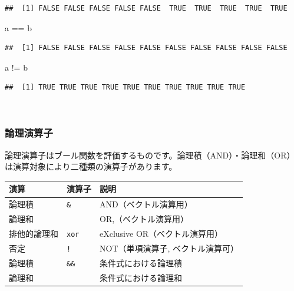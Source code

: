 \documentclass[
  12pt,
]{book}
\newenvironment{Shaded}{\begin{snugshade}}{\end{snugshade}}
\newcommand{\NormalTok}[1]{#1}
\newcommand{\SpecialCharTok}[1]{\textcolor[rgb]{0.00,0.00,0.00}{#1}}
\begin{document}
\begin{verbatim}
##  [1] FALSE FALSE FALSE FALSE FALSE  TRUE  TRUE  TRUE  TRUE  TRUE
\end{verbatim}

\begin{Shaded}
\begin{Highlighting}[]
\NormalTok{a }\SpecialCharTok{==}\NormalTok{ b}
\end{Highlighting}
\end{Shaded}

\begin{verbatim}
##  [1] FALSE FALSE FALSE FALSE FALSE FALSE FALSE FALSE FALSE FALSE
\end{verbatim}

\begin{Shaded}
\begin{Highlighting}[]
\NormalTok{a }\SpecialCharTok{!=}\NormalTok{ b}
\end{Highlighting}
\end{Shaded}

\begin{verbatim}
##  [1] TRUE TRUE TRUE TRUE TRUE TRUE TRUE TRUE TRUE TRUE
\end{verbatim}

　

\hypertarget{ux8ad6ux7406ux6f14ux7b97ux5b50}{%
\subsubsection{論理演算子}\label{ux8ad6ux7406ux6f14ux7b97ux5b50}}

論理演算子はブール関数を評価するものです。論理積（AND）・論理和（OR）は演算対象により二種類の演算子があります。 　

\begin{longtable}[]{@{}lll@{}}
\toprule
演算 & 演算子 & 説明 \\
\midrule
\endhead
論理積 & \texttt{\&} & AND（ベクトル演算用） \\
論理和 & \texttt{\textbar{}} & OR,（ベクトル演算用） \\
排他的論理和 & \texttt{xor} & eXclusive OR（ベクトル演算用） \\
否定 & \texttt{!} & NOT（単項演算子, ベクトル演算可） \\
論理積 & \texttt{\&\&} & 条件式における論理積 \\
論理和 & \texttt{\textbar{}\textbar{}} & 条件式における論理和 \\
\bottomrule
\end{longtable}
\end{document}
